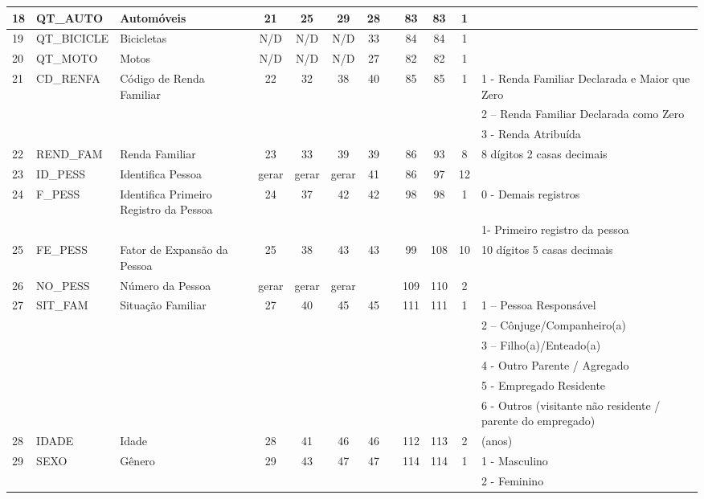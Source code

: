 \begin{table}[htbp]
\begin{center}
\begin{tabular}{|p{1cm}|l|l|c|c|c|c|c|c|c|c|l|}
18 & QT\_AUTO & Automóveis & 21 & 25 & 29 & 28 &  & 83 & 83 & 1 &  \\ \hline
19 & QT\_BICICLE & Bicicletas & N/D & N/D & N/D & 33 &  & 84 & 84 & 1 &  \\ \hline
20 & QT\_MOTO & Motos & N/D & N/D & N/D & 27 &  & 82 & 82 & 1 &  \\ \hline
21 & CD\_RENFA & Código de Renda Familiar & 22 & 32 & 38 & 40 &  & 85 & 85 & 1 & 1 - Renda Familiar Declarada e Maior que Zero \\ \hline
 &  &  &  &  &  &  &  &  &  &  & 2 – Renda Familiar Declarada como Zero \\ \hline
 &  &  &  &  &  &  &  &  &  &  & 3 - Renda Atribuída \\ \hline
22 & REND\_FAM & Renda Familiar & 23 & 33 & 39 & 39 &  & 86 & 93 & 8 & 8 dígitos 2 casas decimais \\ \hline
23 & ID\_PESS & Identifica Pessoa & gerar & gerar & gerar & 41 &  & 86 & 97 & 12 &  \\ \hline
24 & F\_PESS & Identifica Primeiro Registro da Pessoa & 24 & 37 & 42 & 42 &  & 98 & 98 & 1 & 0 - Demais registros \\ \hline
 &  &  &  &  &  &  &  &  &  &  & 1- Primeiro registro da pessoa \\ \hline
25 & FE\_PESS & Fator de Expansão da Pessoa & 25 & 38 & 43 & 43 &  & 99 & 108 & 10 & 10 dígitos 5 casas decimais \\ \hline
26 & NO\_PESS & Número da Pessoa & gerar & gerar & gerar &  &  & 109 & 110 & 2 &  \\ \hline
27 & SIT\_FAM & Situação Familiar & 27 & 40 & 45 & 45 &  & 111 & 111 & 1 & 1 – Pessoa Responsável \\ \hline
 &  &  &  &  &  &  &  &  &  &  & 2 – Cônjuge/Companheiro(a) \\ \hline
 &  &  &  &  &  &  &  &  &  &  & 3 – Filho(a)/Enteado(a) \\ \hline
 &  &  &  &  &  &  &  &  &  &  & 4 - Outro Parente / Agregado \\ \hline
 &  &  &  &  &  &  &  &  &  &  & 5 - Empregado Residente \\ \hline
 &  &  &  &  &  &  &  &  &  &  & 6 - Outros (visitante não residente / parente do empregado) \\ \hline
28 & IDADE & Idade & 28 & 41 & 46 & 46 &  & 112 & 113 & 2 & (anos) \\ \hline
29 & SEXO & Gênero & 29 & 43 & 47 & 47 &  & 114 & 114 & 1 & 1 - Masculino \\ \hline
 &  &  &  &  &  &  &  &  &  &  & 2 - Feminino \\ \hline

\end{tabular}
\end{center}
\end{table}

